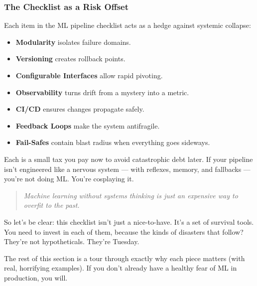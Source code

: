 \vspace{1em}

\subsubsection{The Checklist as a Risk Offset}

Each item in the ML pipeline checklist acts as a hedge against systemic collapse:

\begin{itemize}
    \item \textbf{Modularity} isolates failure domains.
    \item \textbf{Versioning} creates rollback points.
    \item \textbf{Configurable Interfaces} allow rapid pivoting.
    \item \textbf{Observability} turns drift from a mystery into a metric.
    \item \textbf{CI/CD} ensures changes propagate safely.
    \item \textbf{Feedback Loops} make the system antifragile.
    \item \textbf{Fail-Safes} contain blast radius when everything goes sideways.
\end{itemize}

Each is a small tax you pay now to avoid catastrophic debt later. If your pipeline isn't engineered like a nervous system — with reflexes, memory, and fallbacks — you're not doing ML. You're cosplaying it.

\vspace{1em}

\begin{quote}
\textit{Machine learning without systems thinking is just an expensive way to overfit to the past.}
\end{quote}



So let’s be clear: this checklist isn’t just a nice-to-have. It’s a set of survival tools. You need to invest in each of them, because the kinds of disasters that follow? They’re not hypotheticals. They’re Tuesday.

The rest of this section is a tour through exactly why each piece matters (with real, horrifying examples). If you don’t already have a healthy fear of ML in production, you will.



